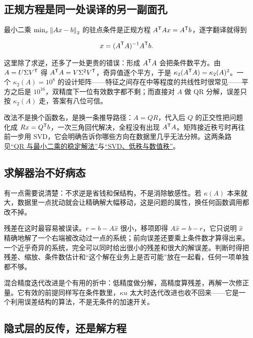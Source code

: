 \subsection{正规方程是同一处误译的另一副面孔}

最小二乘 \(\min_x\left\lVert Ax-b\right\rVert_2\) 的驻点条件是正规方程 \(A^{\mathsf{T}}Ax=A^{\mathsf{T}}b\)，逐字翻译就得到

\[
x=(A^{\mathsf{T}}A)^{-1}A^{\mathsf{T}}b.
\]

这里除了求逆，还多了一处更贵的错误：形成 \(A^{\mathsf{T}}A\) 会把条件数平方。由 \(A=U\Sigma V^{\mathsf{T}}\) 得 \(A^{\mathsf{T}}A=V\Sigma^2V^{\mathsf{T}}\)，奇异值逐个平方，于是 \(\kappa_2(A^{\mathsf{T}}A)=\kappa_2(A)^2\)。一个 \(\kappa_2(A)=10^8\) 的设计矩阵——特征之间存在中等程度的共线性时很常见——平方之后是 \(10^{16}\)，双精度下一位有效数字都不剩；而直接对 \(A\) 做 QR 分解，误差只按 \(\kappa_2(A)\) 走，答案有八位可信。

改法不是换个函数名，是换一条推导路径：\(A=QR\)，代入后 \(Q\) 的正交性把问题化成 \(Rx=Q^{\mathsf{T}}b\)，一次三角回代解决，全程没有出现 \(A^{\mathsf{T}}A\)。矩阵接近秩亏时再往前一步用 SVD，它会明确告诉你哪些方向在数据里几乎无法分辨。这两条路见\hyperref[sec:08-Numerical-Analysis/05-Numerical-Linear-Algebra/02]{``QR 与最小二乘的稳定解法''}与\hyperref[sec:08-Numerical-Analysis/05-Numerical-Linear-Algebra/06]{``SVD、低秩与数值秩''}。

\subsection{求解器治不好病态}

有一点需要说清楚：不求逆是省钱和保结构，不是消除敏感性。若 \(\kappa(A)\) 本来就大，数据里一点扰动就会让精确解大幅移动，这是问题的属性，换任何函数调用都改不掉。

残差在这时最容易被误读。\(r=b-A\hat x\) 很小，移项即得 \(A\hat x=b-r\)，它只说明 \(\hat x\) 精确地解了一个右端被改动过一点的系统；前向误差还要乘上条件数才算得出来。一个近乎奇异的系统，完全可以同时给出很小的残差和很大的解误差。判断时得把残差、缩放、条件数估计和``这个解在业务上是否可能''放在一起看，任何一项单独都不够。

混合精度迭代改进是个有用的折中：低精度做分解，高精度算残差，再解一次修正量。它有效的前提同样写在条件数里，\(\kappa u\) 太大时迭代改进也收不回来——它是一个利用误差结构的算法，不是无条件的加速开关。

\subsection{隐式层的反传，还是解方程}

